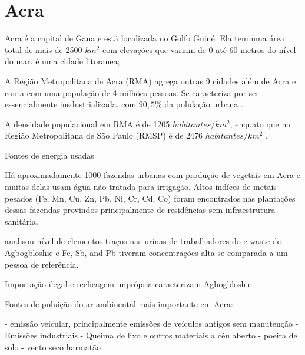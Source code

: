 \section{Acra}

Acra é a capital de Gana e está localizada no Golfo Guiné. Ela tem uma área 
total de mais de 2500 $km^2$ com elevações que variam de 0 até 60 metros do nível 
do mar. é uma cidade litoranea;

A Região Metropolitana de Acra (RMA) agrega outras 9 cidades
além de Acra e conta com uma população de 4 milhões pessoas. 
Se caracteriza por ser essencialmente insdustrializada, com $90,5\%$ 
da polulação urbana \cite{censu2013}.

A densidade populacional em RMA é de 1205 $habitantes/km^2$, 
enquato que na Região Metropolitana de São Paulo (RMSP) é de 
2476 $habitantes/km^2$ \cite{ibge2011}. 


\begin{table}[H]
 \centering
  
  \caption{Fontes de energia usadas \cite{censu2013}}
\end{table}

Há aproximadamente 1000 fazendas urbanas com produção de vegetais em Acra e 
muitas delas usam água não tratada para irrigação. Altos indíces de 
metais pesados (Fe, Mn, Cu, Zn, Pb, Ni, Cr, Cd, Co)
foram encontrados nas plantações dessas fazendas \cite{lente2014} provindos 
principalmente de residências sem infraestrutura sanitária. 


\cite{asante2012} analisou nível de elementos traços nas urinas de trabalhadores 
do e-waste de Agbogbloshie e Fe, Sb, and Pb tiveram concentrações alta se comparada
a um pessoa de referência. 

Importação ilegal e reclicagem imprópria caracterizam Agbogbloshie.


Fontes de poluição do ar ambinental mais importante em Acra:

- emissão veicular, principalmente emissões de veículos antigos sem manutenção
- Emissões industriais
- Queima de lixo e outros materiais a céu aberto
- poeira de solo
- vento seco harmatão


